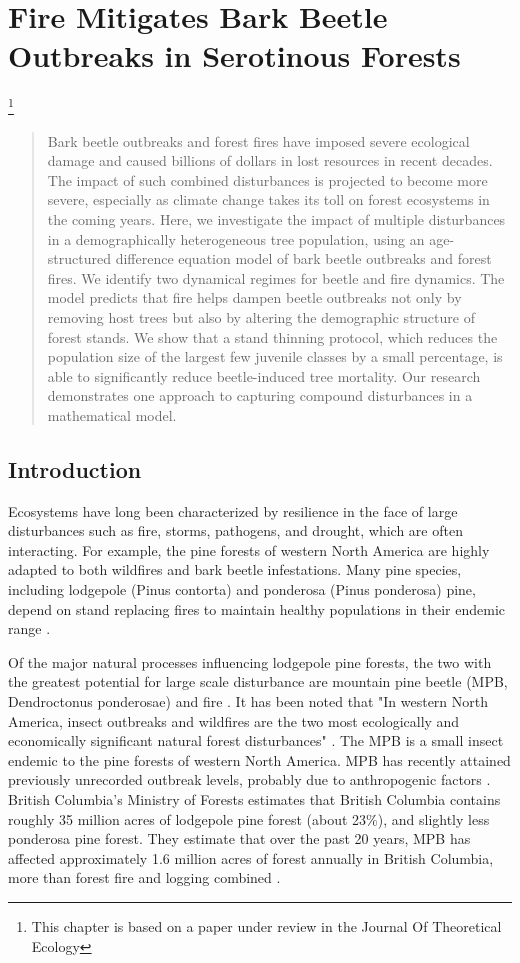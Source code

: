 \chapter{Fire Mitigates Bark Beetle Outbreaks in Serotinous Forests }
\label{ch3}
\let\thefootnote\relax\footnote{This chapter is based on a paper under review in the Journal Of Theoretical Ecology}
\begin{abstract}
Bark beetle outbreaks and forest fires have imposed severe ecological damage and caused billions of dollars in lost resources in recent decades. The impact of such combined disturbances is projected to become more severe, especially as climate change takes its toll on forest ecosystems in the coming years. Here, we investigate the impact of multiple disturbances in a demographically heterogeneous tree population, using an age-structured difference equation model of bark beetle outbreaks and forest fires. We identify two dynamical regimes for beetle and fire dynamics. The model predicts that fire helps dampen beetle outbreaks not only by removing host trees but also by altering the demographic structure of forest stands. We show that a stand thinning protocol, which reduces the population size of the largest few juvenile classes by a small percentage, is able to significantly reduce beetle-induced tree mortality.  Our research demonstrates one approach to capturing compound disturbances in a mathematical model.
\end{abstract}

\section{Introduction}

Ecosystems have long been characterized by resilience in the face of large disturbances such as fire, storms, pathogens, and drought, which are often interacting. For example, the pine forests of western North America are highly adapted to both wildfires and bark beetle infestations. Many pine species, including lodgepole (Pinus contorta) and ponderosa (Pinus ponderosa) pine, depend on stand replacing fires to maintain healthy populations in their endemic range \cite{bentz2010climate}. 

Of the major natural processes influencing lodgepole pine forests, the two with the greatest potential for large scale disturbance are mountain pine beetle (MPB, Dendroctonus ponderosae) and fire \cite{kaufmann2008status}. It has been noted that "In western North America, insect outbreaks and wildfires are the two most ecologically and economically significant natural forest disturbances" \cite{meigs2016insect}. The MPB is a small insect endemic to the pine forests of western North America. MPB has recently attained previously unrecorded outbreak levels, probably due to anthropogenic factors \cite{bentz2010climate,safranyik2007mountain}.  British Columbia's Ministry of Forests estimates that British Columbia contains roughly 35 million acres of lodgepole pine forest (about 23\%), and slightly less ponderosa pine forest. They estimate that over the past 20 years, MPB has affected approximately 1.6 million acres of forest annually in British Columbia, more than forest fire and logging combined \cite{bc2010state}.

